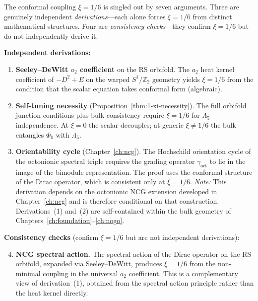 \begin{remark}[Seven-fold convergence of $\xi = 1/6$: three derivations and four consistency checks]
\label{rem:1-seven-proofs}
The conformal coupling $\xi = 1/6$ is singled out by seven arguments. Three are genuinely independent \emph{derivations}---each alone forces $\xi = 1/6$ from distinct mathematical structures. Four are \emph{consistency checks}---they confirm $\xi = 1/6$ but do not independently derive it.

\medskip\noindent\textbf{Independent derivations:}
\begin{enumerate}
\item \textbf{Seeley--DeWitt $a_2$ coefficient} on the RS orbifold. The $a_2$ heat kernel coefficient of $-D^2 + E$ on the warped $S^1/\mathbb{Z}_2$ geometry yields $\xi = 1/6$ from the condition that the scalar equation takes conformal form (algebraic).

\item \textbf{Self-tuning necessity} (Proposition~\ref{thm:1-xi-necessity}). The full orbifold junction conditions plus bulk consistency require $\xi = 1/6$ for $\Lambda_5$-independence. At $\xi = 0$ the scalar decouples; at generic $\xi \neq 1/6$ the bulk entangles $\Phi_0$ with $\Lambda_5$.

\item \textbf{Orientability cycle} (Chapter~\ref{ch:ncg}). The Hochschild orientation cycle of the octonionic spectral triple requires the grading operator $\gamma_\mathrm{oct}$ to lie in the image of the bimodule representation. The proof uses the conformal structure of the Dirac operator, which is consistent only at $\xi = 1/6$. \emph{Note:} This derivation depends on the octonionic NCG extension developed in Chapter~\ref{ch:ncg} and is therefore conditional on that construction. Derivations~(1) and~(2) are self-contained within the bulk geometry of Chapters~\ref{ch:foundation}--\ref{ch:nogo}.
\end{enumerate}

\noindent\textbf{Consistency checks} (confirm $\xi = 1/6$ but are not independent derivations):
\begin{enumerate}\setcounter{enumi}{3}
\item \textbf{NCG spectral action.} The spectral action of the Dirac operator on the RS orbifold, expanded via Seeley--DeWitt, produces $\xi = 1/6$ from the non-minimal coupling in the universal $a_2$ coefficient. This is a complementary view of derivation~(1), obtained from the spectral action principle rather than the heat kernel directly.


\end{enumerate}
\end{remark}
